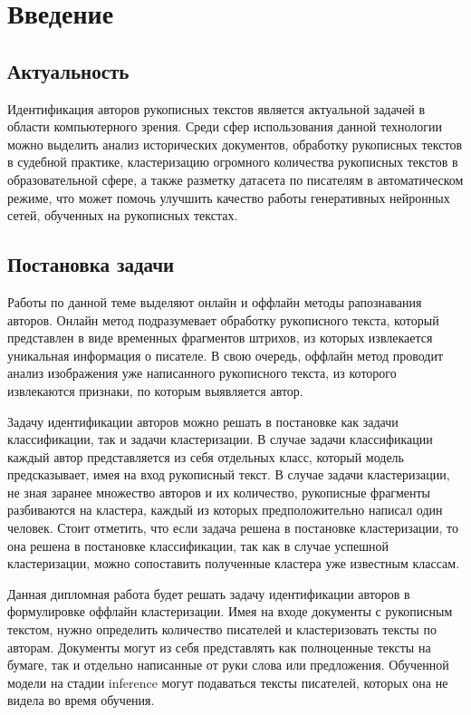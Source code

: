 
\section{Введение}

\subsection{Актуальность}
    Идентификация авторов рукописных текстов является актуальной задачей в области компьютерного зрения. Среди сфер использования данной технологии можно выделить анализ исторических документов, обработку рукописных текстов в судебной практике, кластеризацию огромного количества рукописных текстов в образовательной сфере, а также разметку датасета по писателям в автоматическом режиме, что может помочь улучшить качество работы генеративных нейронных сетей, обученных на рукописных текстах.

\subsection{Постановка задачи}    
    Работы по данной теме выделяют онлайн и оффлайн методы рапознавания авторов. Онлайн метод подразумевает обработку рукописного текста, который представлен в виде временных фрагментов штрихов, из которых извлекается уникальная информация о писателе. В свою очередь, оффлайн метод проводит анализ изображения уже написанного рукописного текста, из которого извлекаются признаки, по которым выявляется автор.
    
    Задачу идентификации авторов можно решать в постановке как задачи классификации, так и задачи кластеризации. В случае задачи классификации каждый автор представляется из себя отдельных класс, который модель предсказывает, имея на вход рукописный текст. В случае задачи кластеризации, не зная заранее множество авторов и их количество, рукописные фрагменты разбиваются на кластера, каждый из которых предположительно написал один человек. Стоит отметить, что если задача решена в постановке кластеризации, то она решена в постановке классификации, так как в случае успешной кластеризации, можно сопоставить полученные кластера уже известным классам.

    Данная дипломная работа будет решать задачу идентификации авторов в формулировке оффлайн кластеризации. Имея на входе документы с рукописным текстом, нужно определить количество писателей и кластеризовать тексты по авторам. Документы могут из себя представлять как полноценные тексты на бумаге, так и отдельно написанные от руки слова или предложения. Обученной модели на стадии inference могут подаваться тексты писателей, которых она не видела во время обучения.

